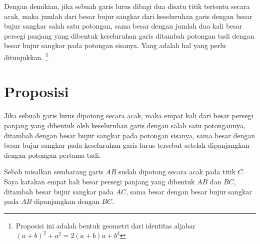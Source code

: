 \documentclass[a4paper]{book}
\begin{document}
Dengan demikian, jika sebuah garis lurus dibagi dua disatu titik tertentu 
secara acak, maka jumlah dari besar bujur sangkar dari keseluruhan garis dengan 
besar bujur sangkar salah satu potongan, sama besar dengan jumlah dua kali 
besar persegi panjang yang dibentuk
keseluruhan garis ditambah potongan tadi dengan besar bujur sangkar pada potongan
sisanya. Yang adalah hal yang perlu ditunjukkan. 
\footnote{Proposisi ini adalah bentuk
geometri dari identitas aljabar $(a + b)^2 + a^2 = 2(a + b)a + b^2 $ }

\section*{\centering Proposisi \thesection} 

Jika sebuah garis lurus dipotong secara acak, maka empat kali dari besar
persegi panjang yang dibentuk oleh keseluruhan garis dengan salah satu
potongannya, ditambah dengan besar bujur sangkar pada potongan sisanya, 
sama besar dengan besar bujur sangkar pada keseluruhan garis lurus tersebut
setelah dipanjangkan dengan potongan pertama tadi.

\begin{center} 
\end{center}

Sebab misalkan sembarang garis $AB$ sudah dipotong secara acak pada titik $C$.
Saya katakan empat kali besar persegi panjang yang dibentuk $AB$ dan $BC$, 
ditambah besar bujur sangkar pada $AC$, sama besar dengan besar bujur
sangkar pada $AB$ dipanjangkan dengan $BC$.
\end{document}
